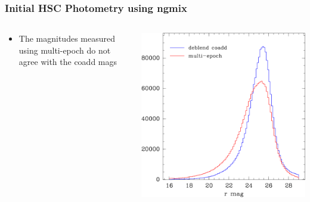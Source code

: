 \documentclass{beamer}
\begin{document}
\frame
{
    \frametitle{Initial HSC Photometry using ngmix}

 
    \begin{columns}
        \begin{column}{0.5\textwidth}
            \begin{itemize}

                \item The magnitudes measured using multi-epoch do not agree
                    with the coadd mags

            \end{itemize}
        \end{column}
        \begin{column}{0.5\textwidth}
            \includegraphics[width=\textwidth]{hsc-mag-compare.png}
        \end{column}
    \end{columns}
}
\end{document}
